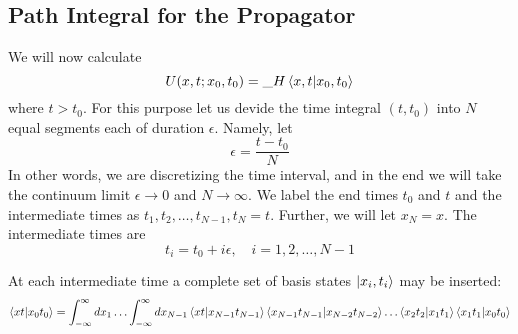 \begin{enumerate}
	\section{Path Integral for the Propagator}
		We will now calculate
		\begin{equation}
			U(x,t;x_0, t_0) = {\_H}\braket{x,t}{x_0, t_0}
			\label{chapter12.eqn1-propagator-path-integral}
		\end{equation}
		where $t>t_0$. For this purpose let us devide the time integral $(t,t_0)$ into $N$ equal segments each of duration $\epsilon$. Namely, let
		\begin{equation}
			\epsilon = \frac{t-t_0}{N}
			\label{chapter12.eqn2-propagator-path-integral}
		\end{equation}
		In other words, we are discretizing the time interval, and in the end we will take the continuum limit $\epsilon\rightarrow 0$ and $N\rightarrow \infty$. We label the end times $t_0$ and $t$ and the intermediate times as $t_1, t_2, \ldots, t_{N-1}, t_N=t$. Further, we will let $x_N=x$. The intermediate times are 
		\begin{equation}
			t_i=t_0+i \epsilon, \quad i=1,2,\ldots,N-1
			\label{chapter12.eqn3-propagator-path-integral}
		\end{equation}
		
		At each intermediate time a complete set of basis states $\ket{x_i,t_i}$ may be inserted:
		\begin{equation}
			\braket{x t}{x_0 t_0} =\int_{-\infty}^{\infty}dx_1 \ldots \int_{-\infty}^{\infty} dx_{N-1} \braket{x t}{x_{N-1} t_{N-1}}\braket{x_{N-1} t_{N-1}}{x_{N-2} t_{N-2}} \ldots \braket{x_2 t_2}{x_{1} t_{1}} \braket{x_1 t_1}{x_{0} t_{0}}
			\label{chapter12.eqn4-propagator-path-integral}
		\end{equation}
		

\end{enumerate}

